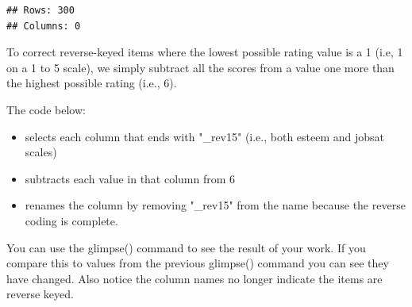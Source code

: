 \documentclass[
]{krantz}
\makeatletter
\newenvironment{Shaded}{\begin{snugshade}}{\end{snugshade}}
\newcommand{\DataTypeTok}[1]{\textcolor[rgb]{0.27,0.27,0.27}{#1}}
\newcommand{\DecValTok}[1]{\textcolor[rgb]{0.06,0.06,0.06}{#1}}
\newcommand{\KeywordTok}[1]{\textcolor[rgb]{0.27,0.27,0.27}{\textbf{#1}}}
\newcommand{\NormalTok}[1]{#1}
\newcommand{\OperatorTok}[1]{\textcolor[rgb]{0.43,0.43,0.43}{\textbf{#1}}}
\newcommand{\StringTok}[1]{\textcolor[rgb]{0.5,0.5,0.5}{#1}}
\providecommand{\tightlist}{%
  \setlength{\itemsep}{0pt}\setlength{\parskip}{0pt}}
\newenvironment{kframe}{%
\medskip{}
\setlength{\fboxsep}{.8em}
 \def\at@end@of@kframe{}%
 \ifinner\ifhmode%
  \def\at@end@of@kframe{\end{minipage}}%
  \begin{minipage}{\columnwidth}%
 \fi\fi%
 \def\FrameCommand##1{\hskip\@totalleftmargin \hskip-\fboxsep
 \colorbox{shadecolor}{##1}\hskip-\fboxsep
     \hskip-\linewidth \hskip-\@totalleftmargin \hskip\columnwidth}%
 \MakeFramed {\advance\hsize-\width
   \@totalleftmargin\z@ \linewidth\hsize
   \@setminipage}}%
 {\par\unskip\endMakeFramed%
 \at@end@of@kframe}
\renewenvironment{Shaded}{\begin{kframe}}{\end{kframe}}
\makeatother
\begin{document}
\begin{Shaded}
\end{Shaded}

\begin{verbatim}
## Rows: 300
## Columns: 0
\end{verbatim}

To correct reverse-keyed items where the lowest possible rating value is a 1 (i.e, 1 on a 1 to 5 scale), we simply subtract all the scores from a value one more than the highest possible rating (i.e., 6).

The code below:

\begin{itemize}
\tightlist
\item
  selects each column that ends with "\_rev15" (i.e., both esteem and jobsat scales)
\item
  subtracts each value in that column from 6
\item
  renames the column by removing "\_rev15" from the name because the reverse coding is complete.
\end{itemize}

\begin{Shaded}
\end{Shaded}

You can use the glimpse() command to see the result of your work. If you compare this to values from the previous glimpse() command you can see they have changed. Also notice the column names no longer indicate the items are reverse keyed.
\end{document}
